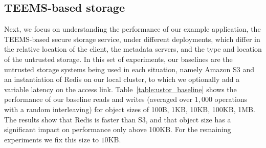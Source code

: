 \subsection{\ac{TEEMS}-based storage}\label{ssec:eval_deploy}
Next, we focus on understanding the performance of our example
application, the  \ac{TEEMS}-based secure storage service, under
different deployments, which differ in the relative location of
the client, the metadata servers, and the type and location of
the untrusted storage. In this set of experiments, our baselines
are the untrusted
storage systems being used in each situation, namely Amazon S3 and an
instantiation of Redis on our local cluster, to which we optionally
add a variable  latency on the
access link.
%
Table~\ref{table:ustor_baseline} shows
the performance of our baseline reads and writes
(averaged over $1,000$ operations with a random interleaving) for object sizes of 100B, 1KB,
10KB, 100KB, 1MB\@. The results show that
Redis is faster than S3, and that
object size has a significant impact on performance only above
100KB\@. For the remaining experiments we fix this size to
$10$KB\@.
\fi
%
